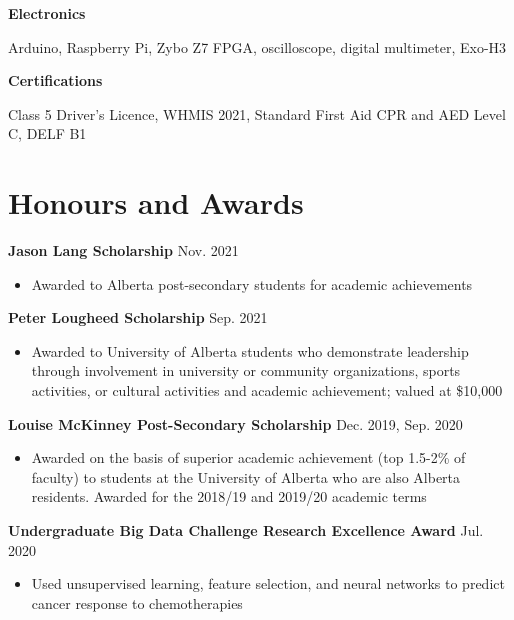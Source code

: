 \documentclass{article}
\begin{document}
\textbf{Electronics} \hfill \parbox[t]{0.8\linewidth}{Arduino, Raspberry Pi, Zybo Z7 FPGA, oscilloscope, digital multimeter, Exo-H3}

\textbf{Certifications} \hfill \parbox[t]{.8\linewidth}{Class 5 Driver's Licence, WHMIS 2021, Standard First Aid CPR and AED Level C, DELF B1}


\section*{\textcolor{my_colour}{Honours and Awards}}
\vspace{-.25em} \hrulefill \vspace{.25em}

\textbf{Jason Lang Scholarship} \hfill Nov. 2021
\begin{itemize}
    \item Awarded to Alberta post-secondary students for academic achievements
\end{itemize} \vspace{1em}

\textbf{Peter Lougheed Scholarship} \hfill Sep. 2021
\begin{itemize}
    \item Awarded to University of Alberta students who demonstrate leadership through involvement in university or community organizations, sports activities, or cultural activities and academic achievement; valued at \$10,000
\end{itemize} \vspace{1em}

\textbf{Louise McKinney Post-Secondary Scholarship} \hfill Dec. 2019, Sep. 2020
\begin{itemize}
    \item Awarded on the basis of superior academic achievement (top 1.5-2\% of faculty) to students at the University of Alberta who are also Alberta residents. Awarded for the 2018/19 and 2019/20 academic terms
\end{itemize} \vspace{1em}

\textbf{Undergraduate Big Data Challenge Research Excellence Award} \hfill Jul. 2020
\begin{itemize}
    \item Used unsupervised learning, feature selection, and neural networks to predict cancer response to chemotherapies
\end{itemize} \vspace{1em}
\end{document}
